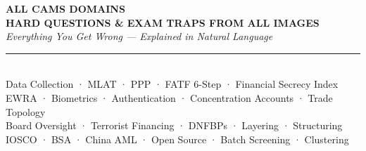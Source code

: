 \documentclass[12pt,aspectratio=169]{beamer}
\begin{document}
	
	\begin{frame}
		\centering
		\vspace{0.5cm}
		{\fontsize{18}{22}\selectfont \textbf{ALL CAMS DOMAINS}}\\[0.15cm]
		{\fontsize{14}{17}\selectfont \textbf{HARD QUESTIONS \& EXAM TRAPS FROM ALL IMAGES}}\\[0.2cm]
		{\fontsize{9}{11}\selectfont \textit{Everything You Get Wrong — Explained in Natural Language}}\\[0.1cm]
		\rule{4cm}{0.5pt}\\[0.1cm]
		{\fontsize{7}{9}\selectfont Data Collection · MLAT · PPP · FATF 6-Step · Financial Secrecy Index}\\[0.05cm]
		{\fontsize{7}{9}\selectfont EWRA · Biometrics · Authentication · Concentration Accounts · Trade Topology}\\[0.05cm]
		{\fontsize{7}{9}\selectfont Board Oversight · Terrorist Financing · DNFBPs · Layering · Structuring}\\[0.05cm]
		{\fontsize{7}{9}\selectfont IOSCO · BSA · China AML · Open Source · Batch Screening · Clustering}
		\vspace{0.3cm}
	\end{frame}
	
\end{document}
